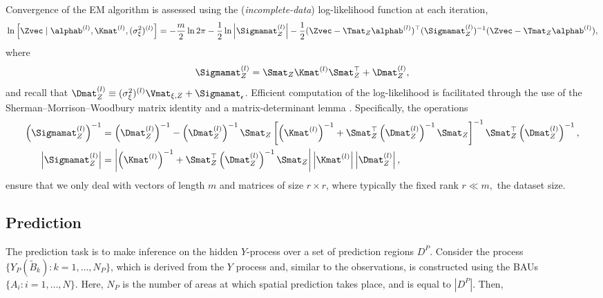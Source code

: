 Convergence of the EM algorithm is assessed using the (\emph{incomplete-data}) log-likelihood function at each iteration,
\begin{equation*}
\ln \left[\Zvec \mid \alphab^{(l)}, \Kmat^{(l)}, (\sigma^2_\xi)^{(l)}\right] = -\frac{m}{2}\ln 2\pi -\frac{1}{2}\ln \left|\Sigmamat_Z^{(l)}\right| - \frac{1}{2}(\Zvec - \Tmat_Z\alphab^{(l)})^\top(\Sigmamat_Z^{(l)})^{-1}(\Zvec - \Tmat_Z\alphab^{(l)}),
\end{equation*}
where
\begin{equation*}
\Sigmamat_Z^{(l)} = \Smat_Z \Kmat^{(l)} \Smat_Z^\top + \Dmat_Z^{(l)},
\end{equation*}
and recall that $\Dmat_{Z}^{(l)} \equiv (\sigma_\xi^2)^{(l)}\Vmat_{\xi,Z} + \Sigmamat_\epsilon$. Efficient computation of the log-likelihood is facilitated through the use of the Sherman--Morrison--Woodbury matrix identity and a matrix-determinant lemma \citep[e.g.,][]{Henderson_1981}. Specifically, the operations
\begin{align*}
\left(\Sigmamat_Z^{(l)}\right)^{-1} &= \left(\Dmat_Z^{(l)}\right)^{-1} - \left(\Dmat_Z^{(l)}\right)^{-1} \Smat_Z \left[\left(\Kmat^{(l)}\right)^{-1} + \Smat^\top_Z \left(\Dmat_Z^{(l)}\right)^{-1}\Smat_Z\right]^{-1}\Smat_Z^\top\left(\Dmat_Z^{(l)}\right)^{-1},\\
\left| \Sigmamat_Z^{(l)}  \right| &= \left| \left(\Kmat^{(l)}\right)^{-1} + \Smat_Z^\top\left(\Dmat_Z^{(l)}\right)^{-1} \Smat_Z \right| \left|\Kmat^{(l)} \right| \left|\Dmat_Z^{(l)}\right|,%
\end{align*}
ensure that we only deal with vectors of length $m$ and matrices of size $r \times r$, where typically the fixed rank $r \ll m,$ the dataset size.


\subsection{Prediction} \label{sec:prediction}

The prediction task is to make inference on the hidden $Y$-process over a set of prediction regions $D^P$. Consider the process $\{Y_P(\tilde{B}_k): k = 1,\dots,N_P\}$, which is derived from the $Y$ process and, similar to the observations, is constructed using the BAUs $\{A_i: i = 1,\dots,N\}$. Here, $N_P$ is the number of areas at which spatial prediction takes place, and is equal to $|D^P|$. Then,

